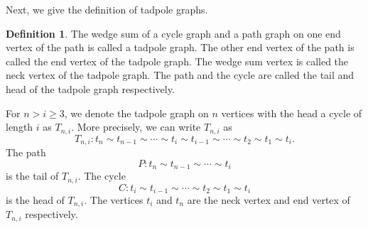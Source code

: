 \documentclass[12pt]{amsart}
\theoremstyle{definition}
\newtheorem{defn}{Definition}[section]
\theoremstyle{remark}
\numberwithin{equation}{section}
\begin{document}
Next, we give the definition of tadpole graphs.
\begin{defn}
The wedge sum of  a cycle graph and a path graph on one end vertex of the path is called a tadpole graph. The other end vertex of the path is called the end vertex of the tadpole graph. The wedge sum vertex is called the neck vertex of the tadpole graph. The path and the cycle are called the tail and head of the tadpole graph respectively.
\end{defn}
For $n>i\geq 3$, we denote the tadpole graph on $n$ vertices with the head a cycle of length $i$ as $T_{n,i}$. More precisely, we can write $T_{n,i}$ as
\begin{equation}\label{eq-tadpole-graph}
T_{n,i}: t_n\sim t_{n-1}\sim \cdots\sim t_i\sim t_{i-1}\sim \cdots \sim t_2\sim t_1\sim t_i.
\end{equation}
The path
$$P:t_n\sim t_{n-1}\sim \cdots\sim t_i$$
is the tail of $T_{n,i}.$ The cycle
$$C:t_i\sim t_{i-1}\sim \cdots \sim t_2\sim t_1\sim t_i$$
is the head of $T_{n,i}$. The vertices $t_i$ and $t_n $ are the neck vertex and end vertex of $T_{n,i}$ respectively. 
\end{document}

